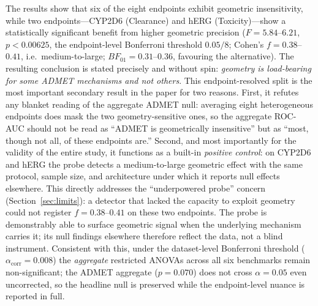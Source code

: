 \documentclass[pdflatex,sn-vancouver-num]{sn-jnl}%
\theoremstyle{thmstyleone}%
\theoremstyle{thmstyletwo}%
\theoremstyle{thmstylethree}%
\begin{document}
The results show that six of the eight endpoints exhibit geometric insensitivity, while two endpoints---CYP2D6 (Clearance) and hERG (Toxicity)---show a statistically significant benefit from higher geometric precision ($F = 5.84$--$6.21$, $p < 0.00625$, the endpoint-level Bonferroni threshold $0.05/8$; Cohen's $f = 0.38$--$0.41$, i.e.\ medium-to-large; $BF_{01} = 0.31$--$0.36$, favouring the alternative).  The resulting conclusion is stated precisely and without spin: \emph{geometry is load-bearing for some ADMET mechanisms and not others}.  This endpoint-resolved split is the most important secondary result in the paper for two reasons.  First, it refutes any blanket reading of the aggregate ADMET null: averaging eight heterogeneous endpoints does mask the two geometry-sensitive ones, so the aggregate ROC-AUC should not be read as ``ADMET is geometrically insensitive'' but as ``most, though not all, of these endpoints are.''  Second, and most importantly for the validity of the entire study, it functions as a built-in \emph{positive control}: on CYP2D6 and hERG the probe detects a medium-to-large geometric effect with the same protocol, sample size, and architecture under which it reports null effects elsewhere.  This directly addresses the ``underpowered probe'' concern (Section~\ref{sec:limits}): a detector that lacked the capacity to exploit geometry could not register $f = 0.38$--$0.41$ on these two endpoints.  The probe is demonstrably able to surface geometric signal when the underlying mechanism carries it; its null findings elsewhere therefore reflect the data, not a blind instrument.  Consistent with this, under the dataset-level Bonferroni threshold ($\alpha_{\mathrm{corr}} = 0.008$) the \emph{aggregate} restricted ANOVAs across all six benchmarks remain non-significant; the ADMET aggregate ($p = 0.070$) does not cross $\alpha = 0.05$ even uncorrected, so the headline null is preserved while the endpoint-level nuance is reported in full.
\end{document}
